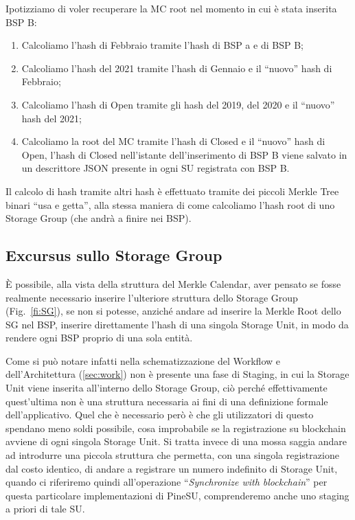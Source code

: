 Ipotizziamo di voler recuperare la MC root nel momento in cui è stata inserita BSP B:
\begin{enumerate}
    \item Calcoliamo l'hash di Febbraio tramite l'hash di BSP a e di BSP B;
    \item Calcoliamo l'hash del 2021 tramite l'hash di Gennaio e il “nuovo” hash di Febbraio;
    \item Calcoliamo l'hash di Open tramite gli hash del 2019, del 2020 e il “nuovo” hash del 2021;
    \item Calcoliamo la root del MC tramite l'hash di Closed e il “nuovo” hash di Open, l'hash di Closed nell'istante dell'inserimento di BSP B viene salvato in un descrittore JSON presente in ogni SU registrata con BSP B.
\end{enumerate}
Il calcolo di hash tramite altri hash è effettuato tramite dei piccoli Merkle Tree binari “usa e getta”, alla stessa maniera di come calcoliamo l'hash root di uno Storage Group (che andrà a finire nei BSP).

\subsection{Excursus sullo Storage Group}
\label{sub:stage1}
È possibile, alla vista della struttura del Merkle Calendar, aver pensato se fosse realmente
necessario inserire l'ulteriore struttura dello Storage Group (Fig.~\ref{fi:SG}), se non si potesse,
anziché andare ad inserire la Merkle Root dello SG nel BSP, inserire direttamente
l'hash di una singola Storage Unit, in modo da rendere ogni BSP proprio di una sola entità.

Come si può notare infatti nella schematizzazione del Workflow e dell'Architettura
(\autoref{sec:work}) non è presente una fase di Staging, in cui la Storage Unit viene
inserita all'interno dello Storage Group, ciò perché effettivamente quest'ultima non è
una struttura necessaria ai fini di una definizione formale dell'applicativo.
Quel che è necessario però è che gli utilizzatori di questo spendano meno soldi possibile,
cosa improbabile se la registrazione su blockchain avviene di ogni singola Storage Unit.
Si tratta invece di una mossa saggia andare ad introdurre una piccola struttura che permetta,
con una singola registrazione dal costo identico, di andare a registrare un numero
indefinito di Storage Unit, quando ci riferiremo quindi all'operazione
“\emph{Synchronize with blockchain}” per questa particolare implementazioni di PineSU,
comprenderemo anche uno staging a priori di tale SU.

